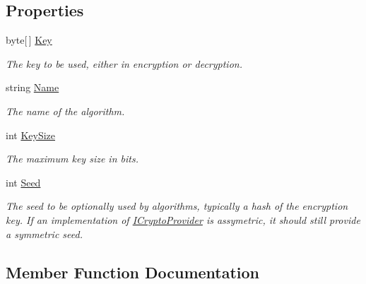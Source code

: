 \subsection*{Properties}
\begin{DoxyCompactItemize}
\item 
byte\mbox{[}$\,$\mbox{]} \hyperlink{interface_stegosaurus_1_1_cryptography_1_1_i_crypto_provider_a0a8633906966fa70858e0762db3633af}{Key}
\begin{DoxyCompactList}\small\item\em The key to be used, either in encryption or decryption. \end{DoxyCompactList}\item 
string \hyperlink{interface_stegosaurus_1_1_cryptography_1_1_i_crypto_provider_a9b2e3db9ac5f22d5c30d5f1877e18bbb}{Name}
\begin{DoxyCompactList}\small\item\em The name of the algorithm. \end{DoxyCompactList}\item 
int \hyperlink{interface_stegosaurus_1_1_cryptography_1_1_i_crypto_provider_a0322f20ed8b9f630de3945fcd32e282e}{Key\+Size}
\begin{DoxyCompactList}\small\item\em The maximum key size in bits. \end{DoxyCompactList}\item 
int \hyperlink{interface_stegosaurus_1_1_cryptography_1_1_i_crypto_provider_acbb21695dbfa48878dda20f5159bc60b}{Seed}
\begin{DoxyCompactList}\small\item\em The seed to be optionally used by algorithms, typically a hash of the encryption key. If an implementation of \hyperlink{interface_stegosaurus_1_1_cryptography_1_1_i_crypto_provider}{I\+Crypto\+Provider} is assymetric, it should still provide a symmetric seed. \end{DoxyCompactList}\end{DoxyCompactItemize}


\subsection{Member Function Documentation}
